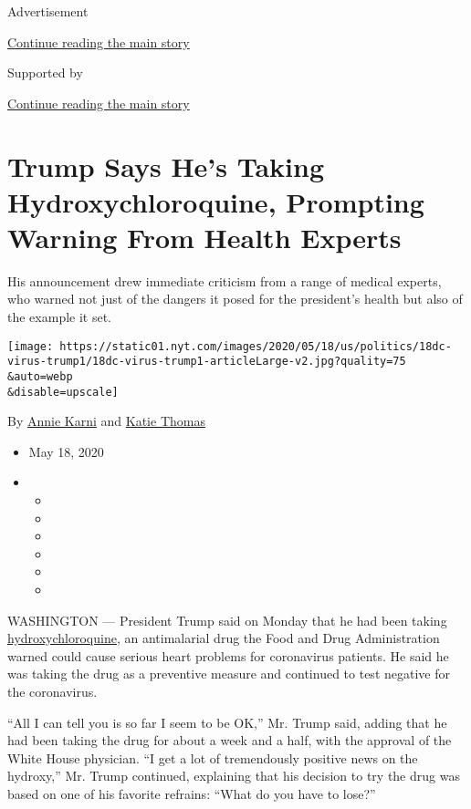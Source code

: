 Advertisement

\protect\hyperlink{after-top}{Continue reading the main story}

Supported by

\protect\hyperlink{after-sponsor}{Continue reading the main story}

\hypertarget{trump-says-hes-taking-hydroxychloroquine-prompting-warning-from-health-experts}{%
\section{Trump Says He's Taking Hydroxychloroquine, Prompting Warning
From Health
Experts}\label{trump-says-hes-taking-hydroxychloroquine-prompting-warning-from-health-experts}}

His announcement drew immediate criticism from a range of medical
experts, who warned not just of the dangers it posed for the president's
health but also of the example it set.

\texttt{[image: https://static01.nyt.com/images/2020/05/18/us/politics/18dc-virus-trump1/18dc-virus-trump1-articleLarge-v2.jpg?quality=75\\\&auto=webp\\\&disable=upscale]}

By \href{https://www.nytimes.com/by/annie-karni}{Annie Karni} and
\href{https://www.nytimes.com/by/katie-thomas}{Katie Thomas}

\begin{itemize}
\item
  May 18, 2020
\item
  \begin{itemize}
  \item
  \item
  \item
  \item
  \item
  \item
  \end{itemize}
\end{itemize}

WASHINGTON --- President Trump said on Monday that he had been taking
\href{https://www.nytimes.com/article/hydroxychloroquine-coronavirus.html}{hydroxychloroquine},
an antimalarial drug the Food and Drug Administration warned could cause
serious heart problems for coronavirus patients. He said he was taking
the drug as a preventive measure and continued to test negative for the
coronavirus.

``All I can tell you is so far I seem to be OK,'' Mr. Trump said, adding
that he had been taking the drug for about a week and a half, with the
approval of the White House physician. ``I get a lot of tremendously
positive news on the hydroxy,'' Mr. Trump continued, explaining that his
decision to try the drug was based on one of his favorite refrains:
``What do you have to lose?''

